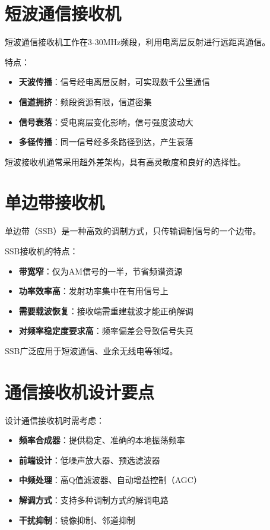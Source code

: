 \section{短波通信接收机}
\label{sec:shortwave_receiver}

短波通信接收机工作在3-30MHz频段，利用电离层反射进行远距离通信。

特点：
\begin{itemize}
    \item \textbf{天波传播}：信号经电离层反射，可实现数千公里通信
    \item \textbf{信道拥挤}：频段资源有限，信道密集
    \item \textbf{信号衰落}：受电离层变化影响，信号强度波动大
    \item \textbf{多径传播}：同一信号经多条路径到达，产生衰落
\end{itemize}

短波接收机通常采用超外差架构，具有高灵敏度和良好的选择性。

\section{单边带接收机}
\label{sec:ssb_receiver}

单边带（SSB）是一种高效的调制方式，只传输调制信号的一个边带。

SSB接收机的特点：
\begin{itemize}
    \item \textbf{带宽窄}：仅为AM信号的一半，节省频谱资源
    \item \textbf{功率效率高}：发射功率集中在有用信号上
    \item \textbf{需要载波恢复}：接收端需重建载波才能正确解调
    \item \textbf{对频率稳定度要求高}：频率偏差会导致信号失真
\end{itemize}

SSB广泛应用于短波通信、业余无线电等领域。

\section{通信接收机设计要点}
\label{sec:comm_receiver_design}

设计通信接收机时需考虑：

\begin{itemize}
    \item \textbf{频率合成器}：提供稳定、准确的本地振荡频率
    \item \textbf{前端设计}：低噪声放大器、预选滤波器
    \item \textbf{中频处理}：高Q值滤波器、自动增益控制（AGC）
    \item \textbf{解调方式}：支持多种调制方式的解调电路
    \item \textbf{干扰抑制}：镜像抑制、邻道抑制
\end{itemize}

